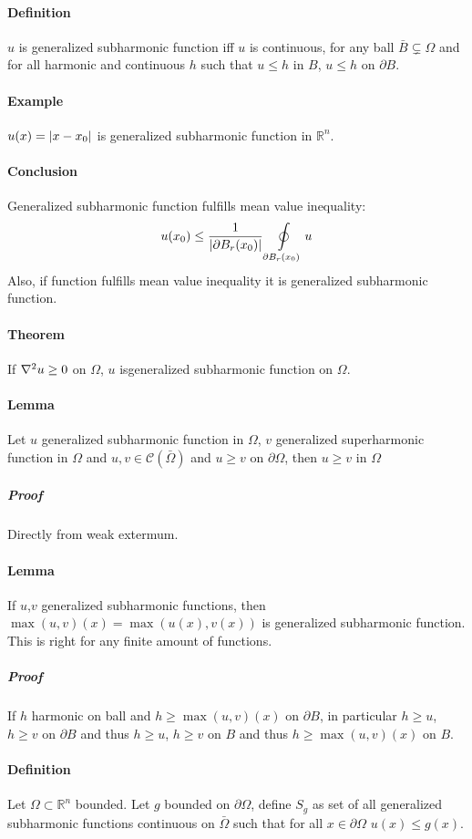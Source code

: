 \paragraph{Definition} $u$ is generalized subharmonic function iff $u$ is continuous, for any ball $\bar{B} \subsetneq \Omega$ and for all harmonic  and continuous $h$ such that  $u\leq h$ in $B$, $u\leq h$ on $\partial B$. 
\paragraph{Example} $u(x) = \abs{x-x_0}$ is generalized subharmonic function  in $\mathbb{R}^n$.
\paragraph{Conclusion} Generalized subharmonic function fulfills mean value inequality:
$$u(x_0) \leq \frac{1}{\abs{\partial B_r(x_0)}} \oint\limits_{\partial B_r(x_0)} u$$
Also, if function fulfills mean value inequality it is generalized subharmonic function.
\paragraph{Theorem}
If $\laplacian{u}\geq 0$ on $\Omega$, $u$ isgeneralized subharmonic function on $\Omega$.
\paragraph{Lemma} Let $u$ generalized subharmonic function in $\Omega$, $v$ generalized superharmonic function in $\Omega$ and $u,v \in \mathcal{C}(\bar{\Omega})$ and $u\geq v$ on $\partial \Omega$, then $u \geq v$ in $\Omega$ 
\subparagraph{Proof} Directly from weak extermum.
\paragraph{Lemma}
If $u$,$v$  generalized subharmonic functions, then $\max(u,v)(x) = \max(u(x), v(x))$ is  generalized subharmonic function. This is right for any finite amount of functions.
\subparagraph{Proof}
If $h$ harmonic on ball and $h\geq\max(u,v)(x)$ on $\partial B$, in particular $h\geq u$, $h\geq v$ on $\partial B$ and thus $h\geq u$, $h\geq v$ on $B$ and thus $h\geq\max(u,v)(x)$ on $B$.
\paragraph{Definition} Let $\Omega \subset \mathbb{R}^n$ bounded. Let $g$ bounded on $\partial \Omega$, define $S_g$ as set of all generalized subharmonic functions continuous on $\bar{\Omega}$ such that for all $x\in \partial \Omega$ $u(x) \leq g(x)$.
